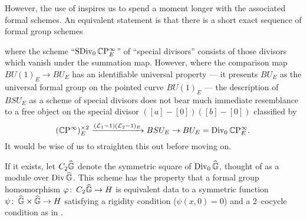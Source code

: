 However, the use of  inspires us to spend a moment longer with the associated formal schemes.  An equivalent statement is that there is a short exact sequence of formal group schemes
\begin{center}
\end{center}
where the scheme ``$\operatorname{SDiv}_0 \mathbb{C}\mathrm P^\infty_E$'' of ``special divisors'' consists of those divisors which vanish under the summation map.  However, where the comparison map $BU(1)_E \to BU_E$ has an identifiable universal property --- it presents $BU_E$ as the universal formal group on the pointed curve $BU(1)_E$ --- the description of $BSU_E$ as a scheme of special divisors does not bear much immediate resemblance to a free object on the special divisor $([a] - [0])([b] - [0])$ classified by \[(\mathbb{C}\mathrm P^\infty)^{\times 2}_E \xrightarrow{(\mathcal{L}_1 - 1)(\mathcal{L}_2 - 1)_E} BSU_E \to BU_E = \operatorname{Div}_0 \mathbb{C}\mathrm P^\infty_E.\]  It would be wise of us to straighten this out before moving on.

\begin{definition}\label{DefinitionOfC2G}
If it exists, let $C_2 \widehat{\mathbb G}$ denote the symmetric square of $\operatorname{Div}_0 \widehat{\mathbb G}$, thought of as a module over $\operatorname{Div} \widehat{\mathbb G}$.  This scheme has the property that a formal group homomorphism $\varphi\colon\thinspace C_2 \widehat{\mathbb G} \to H$ is equivalent data to a symmetric function $\psi\colon\thinspace \widehat{\mathbb G} \times \widehat{\mathbb G} \to H$ satisfying a rigidity condition ($\psi(x, 0) = 0$) and a $2$--cocycle condition as in .
\end{definition}

